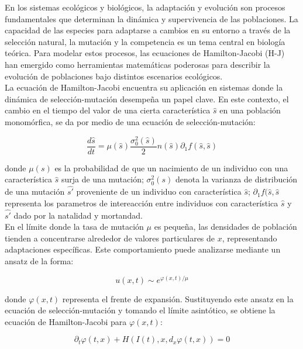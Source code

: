 {            \normalsize{En los sistemas ecológicos y biológicos, la adaptación y evolución son procesos fundamentales que determinan la dinámica y supervivencia de las poblaciones. La capacidad de las especies para adaptarse a cambios en su entorno a través de la selección natural, la mutación y la competencia es un tema central en biología teórica. Para modelar estos procesos, las ecuaciones de Hamilton-Jacobi (H-J) han emergido como herramientas matemáticas poderosas para describir la evolución de poblaciones bajo distintos escenarios ecológicos.}\\

            \normalsize{\citep{Nicolas} La ecuación de Hamilton-Jacobi encuentra su aplicación en sistemas donde la dinámica de selección-mutación desempeña un papel clave. En este contexto, el cambio en el tiempo del valor de una cierta característica $\hat{s}$ en una población monomórfica, se da por medio de una ecuación de selección-mutación:}

            \begin{equation*}
                \frac{d \hat{s}}{d t}=\mu(\hat{s}) \frac{\sigma_0^2(\hat{s})}{2} n(\hat{s}) \partial_1 f(\hat{s}, \hat{s})
            \end{equation*}

            \normalsize{donde $\mu(s)$ es la probabilidad de que un nacimiento de un individuo con una característica $\hat{s}$ surja de una mutación; $\sigma_0^2(s)$ denota la varianza de distribución de una mutación $\hat{s'}$ proveniente de un individuo con característica $\hat{s}$; $\partial_1 f(\hat{s}, \hat{s}$ representa los parametros de intereacción entre individuos con característica $\hat{s}$ y $\hat{s'}$ dado por la natalidad y mortandad.}\\

            \normalsize{\citep{calvez2020} En el límite donde la tasa de mutación \( \mu \) es pequeña, las densidades de población tienden a concentrarse alrededor de valores particulares de \( x \), representando adaptaciones específicas. Este comportamiento puede analizarse mediante un ansatz de la forma:}

            \begin{equation*}
                u(x, t) \sim e^{\varphi(x, t)/\mu}
            \end{equation*}
                
            \normalsize{donde $\varphi(x,t)$ representa el frente de expansión. Sustituyendo este ansatz en la ecuación de selección-mutación y tomando el límite asintótico, se obtiene la ecuación de Hamilton-Jacobi para \( \varphi(x, t) \):}

            \begin{equation*}
                \partial_t \varphi(t, x)+H\left(I(t), x, d_x \varphi(t, x)\right)=0
            \end{equation*}
            
            }
